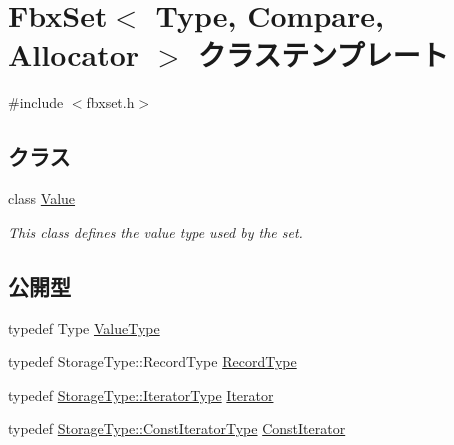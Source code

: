\hypertarget{class_fbx_set}{}\section{Fbx\+Set$<$ Type, Compare, Allocator $>$ クラステンプレート}
\label{class_fbx_set}


{\ttfamily \#include $<$fbxset.\+h$>$}

\subsection*{クラス}
\begin{DoxyCompactItemize}
\item 
class \hyperlink{class_fbx_set_1_1_value}{Value}
\begin{DoxyCompactList}\small\item\em This class defines the value type used by the set. \end{DoxyCompactList}\end{DoxyCompactItemize}
\subsection*{公開型}
\begin{DoxyCompactItemize}
\item 
typedef Type \hyperlink{class_fbx_set_abb0f1b628634e07825532526e2e92baf}{Value\+Type}
\item 
typedef Storage\+Type\+::\+Record\+Type \hyperlink{class_fbx_set_aa3934cd434a09288204f5e6c99b9cd01}{Record\+Type}
\item 
typedef \hyperlink{class_fbx_red_black_tree_af7b6209131012ec5aa33e0286c956cd6}{Storage\+Type\+::\+Iterator\+Type} \hyperlink{class_fbx_set_ad1b543e0f63f04f4d2dc8e9e3da9bcaa}{Iterator}
\item 
typedef \hyperlink{class_fbx_red_black_tree_a7309ae5e1bb24e7e3da94fef975d10c4}{Storage\+Type\+::\+Const\+Iterator\+Type} \hyperlink{class_fbx_set_af9aee2f7b6a6638b816ea95bd510928c}{Const\+Iterator}
\end{DoxyCompactItemize}
